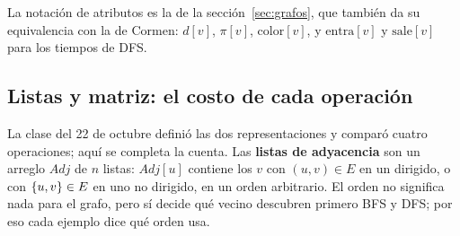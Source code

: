 \documentclass[11pt,letterpaper]{article}
\begin{document}
\newcommand{\busqListaAdy}[3]{%
  \node[anchor=east, font=\small] at (-0.3, #1) {#2};
  \node[draw=gray!80!black, fill=fondoIdea, minimum size=0.5cm,
        inner sep=0pt] at (0, #1) {};
  \foreach \busqElem [count=\busqPos] in {#3} {
    \pgfmathsetmacro{\busqX}{0.85 + (\busqPos - 1)*1.25}
    \node[draw=gray!80!black, minimum size=0.5cm, inner sep=0pt,
          font=\small] at (\busqX, #1) {\busqElem};
    \node[draw=gray!80!black, minimum width=0.3cm,
          minimum height=0.5cm, inner sep=0pt]
      at (\busqX + 0.4, #1) {};
    \fill (\busqX - 0.85, #1) circle (1.1pt);
    \draw[->, >=stealth] (\busqX - 0.85, #1) -- (\busqX - 0.25, #1);
    \xdef\busqUltimoX{\busqX}
  }
  \draw (\busqUltimoX + 0.25, #1 - 0.25)
    -- (\busqUltimoX + 0.55, #1 + 0.25);
}
\newcommand{\busqBaseBFS}{%
  \foreach \busqV/\busqX/\busqY in {r/0/1, s/1/1, t/2/1, u/3/1,
                                     v/0/0, w/1/0, x/2/0, y/3/0}
    \coordinate (\busqV) at (\busqX, \busqY);
  \foreach \busqA/\busqB in {r/s, r/v, s/w, w/t, w/x, t/x, t/u, x/u,
                             x/y, u/y}
    \draw[arista] (\busqA) -- (\busqB);
  \foreach \busqV in {r, s, t, u}
    \node[vert, fill=white, label={[nota, text=black]above:$\busqV$}]
      at (\busqV) {$\infty$};
  \foreach \busqV in {v, w, x, y}
    \node[vert, fill=white, label={[nota, text=black]below:$\busqV$}]
      at (\busqV) {$\infty$};
  \node[font=\small] at (-0.15, -1.15) {$Q$};
}

La notación de atributos es la de la sección~\ref{sec:grafos}, que
también da su equivalencia con la de Cormen: $d[v]$, $\pi[v]$,
$\text{color}[v]$, y $\text{entra}[v]$ y $\text{sale}[v]$ para los
tiempos de DFS.


\subsection*{Listas y matriz: el costo de cada operación}

La clase del 22 de octubre definió las dos representaciones y comparó
cuatro operaciones; aquí se completa la cuenta. Las \textbf{listas de
adyacencia} son un arreglo $\mathit{Adj}$ de $n$ listas:
$\mathit{Adj}[u]$ contiene los $v$ con $(u, v) \in E$ en un dirigido,
o con $\left\{ u, v \right\} \in E$ en uno no dirigido, en un orden arbitrario.
El orden no significa nada para el grafo, pero sí decide qué vecino
descubren primero BFS y DFS; por eso cada ejemplo dice qué orden usa.
\end{document}
